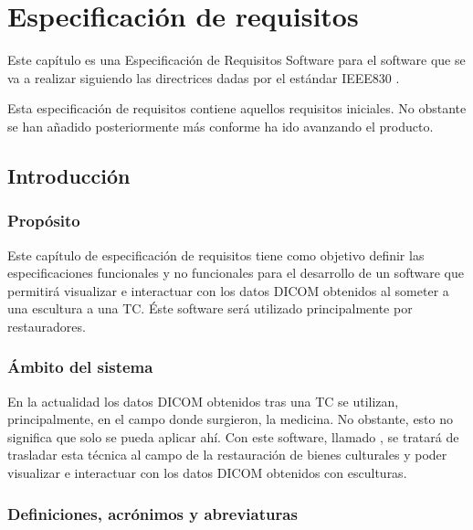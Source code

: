 \chapter{Especificación de requisitos}

Este capítulo es una Especificación de Requisitos Software para el software que se va a realizar siguiendo las directrices dadas por el estándar IEEE830 \cite{iee830}.

Esta especificación de requisitos contiene aquellos requisitos iniciales. No obstante se han añadido posteriormente más conforme ha ido avanzando el producto.

\section{Introducción}

	\subsection{Propósito}
	
	Este capítulo de especificación de requisitos tiene como objetivo definir las especificaciones funcionales y no funcionales para el desarrollo de un software que permitirá visualizar e interactuar con los datos DICOM obtenidos al someter a una escultura a una TC. Éste software será utilizado principalmente por restauradores.
	
	\subsection{Ámbito del sistema}
	
	En la actualidad los datos DICOM obtenidos tras una TC se utilizan, principalmente, en el campo donde surgieron, la medicina. No obstante, esto no significa que solo se pueda aplicar ahí. Con este software, llamado \myTitle, se tratará de trasladar esta técnica al campo de la restauración de bienes culturales y poder visualizar e interactuar con los datos DICOM obtenidos con esculturas.
	
	\subsection{Definiciones, acrónimos y abreviaturas}
	
